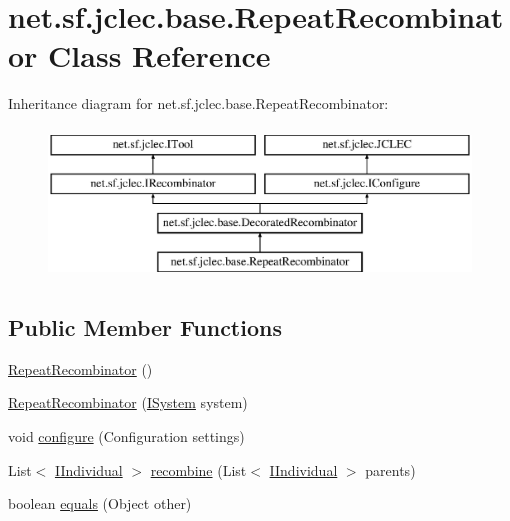 \hypertarget{classnet_1_1sf_1_1jclec_1_1base_1_1_repeat_recombinator}{\section{net.\-sf.\-jclec.\-base.\-Repeat\-Recombinator Class Reference}
\label{classnet_1_1sf_1_1jclec_1_1base_1_1_repeat_recombinator}
}
Inheritance diagram for net.\-sf.\-jclec.\-base.\-Repeat\-Recombinator\-:\begin{figure}[H]
\begin{center}
\leavevmode
\includegraphics[height=4.000000cm]{classnet_1_1sf_1_1jclec_1_1base_1_1_repeat_recombinator}
\end{center}
\end{figure}
\subsection*{Public Member Functions}
\begin{DoxyCompactItemize}
\item 
\hyperlink{classnet_1_1sf_1_1jclec_1_1base_1_1_repeat_recombinator_abf70651cbec6d661181d49fd3cf96c19}{Repeat\-Recombinator} ()
\item 
\hyperlink{classnet_1_1sf_1_1jclec_1_1base_1_1_repeat_recombinator_ad5c5570761e912d258d012ef34bba751}{Repeat\-Recombinator} (\hyperlink{interfacenet_1_1sf_1_1jclec_1_1_i_system}{I\-System} system)
\item 
void \hyperlink{classnet_1_1sf_1_1jclec_1_1base_1_1_repeat_recombinator_aff511cdd75cd7cf31e9a7bace3b37ca7}{configure} (Configuration settings)
\item 
List$<$ \hyperlink{interfacenet_1_1sf_1_1jclec_1_1_i_individual}{I\-Individual} $>$ \hyperlink{classnet_1_1sf_1_1jclec_1_1base_1_1_repeat_recombinator_a515d52a71e12e403d94d881925b70946}{recombine} (List$<$ \hyperlink{interfacenet_1_1sf_1_1jclec_1_1_i_individual}{I\-Individual} $>$ parents)
\item 
boolean \hyperlink{classnet_1_1sf_1_1jclec_1_1base_1_1_repeat_recombinator_a6a88ead4e73bc0d666b77221a1416c82}{equals} (Object other)
\end{DoxyCompactItemize}

